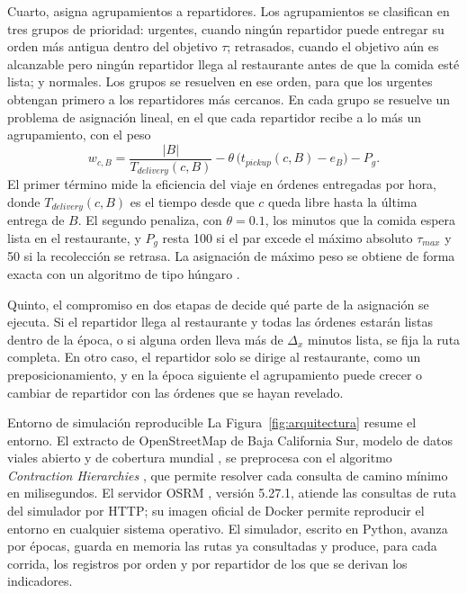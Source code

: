 \documentclass[10pt]{article}
\makeatletter
\renewcommand{\subsection}{\@startsection{subsection}{2}{0pt}{8pt}{0.1pt}
  {\semibold\itshape\fontsize{11}{13.4}\selectfont\addfontfeatures{LetterSpace=6.8}\raggedright}}
\makeatother
\begin{document}
Cuarto, asigna agrupamientos a repartidores. Los agrupamientos se clasifican en tres grupos de
prioridad: urgentes, cuando ningún repartidor puede entregar su orden más antigua dentro del objetivo
$\tau$; retrasados, cuando el objetivo aún es alcanzable pero ningún repartidor llega al restaurante
antes de que la comida esté lista; y normales. Los grupos se resuelven en ese orden, para que los
urgentes obtengan primero a los repartidores más cercanos. En cada grupo se resuelve un problema de
asignación lineal, en el que cada repartidor recibe a lo más un agrupamiento, con el peso
\begin{equation}
  w_{c,B} = \frac{|B|}{T_{delivery}(c,B)} - \theta\,\bigl(t_{pickup}(c,B) - e_B\bigr) - P_g.
  \label{eq:peso}
\end{equation}
El primer término mide la eficiencia del viaje en órdenes entregadas por hora, donde $T_{delivery}(c,B)$
es el tiempo desde que $c$ queda libre hasta la última entrega de $B$. El segundo penaliza, con
$\theta = 0.1$, los minutos que la comida espera lista en el restaurante, y $P_g$ resta 100 si el par
excede el máximo absoluto $\tau_{max}$ y 50 si la recolección se retrasa. La asignación de máximo peso
se obtiene de forma exacta con un algoritmo de tipo húngaro \cite{Kuhn1955}.

Quinto, el compromiso en dos etapas de \cite{Reyes2018} decide qué parte de la asignación se
ejecuta. Si el repartidor llega al restaurante y todas las órdenes estarán listas dentro de la época,
o si alguna orden lleva más de $\Delta_x$ minutos lista, se fija la ruta completa. En otro caso, el
repartidor solo se dirige al restaurante, como un preposicionamiento, y en la época siguiente el
agrupamiento puede crecer o cambiar de repartidor con las órdenes que se hayan revelado.

\subsection{Entorno de simulación reproducible}
La Figura~\ref{fig:arquitectura} resume el entorno. El extracto de OpenStreetMap de Baja California
Sur, modelo de datos viales abierto y de cobertura mundial \cite{Boeing2022}, se preprocesa con el
algoritmo \textit{Contraction Hierarchies} \cite{Geisberger2008}, que permite resolver cada consulta
de camino mínimo en milisegundos. El servidor OSRM \cite{LuxenVetter2011}, versión 5.27.1, atiende
las consultas de ruta del simulador por HTTP; su imagen oficial de Docker permite reproducir el
entorno en cualquier sistema operativo. El simulador, escrito en Python, avanza por épocas, guarda en
memoria las rutas ya consultadas y produce, para cada corrida, los registros por orden y por
repartidor de los que se derivan los indicadores.
\end{document}

